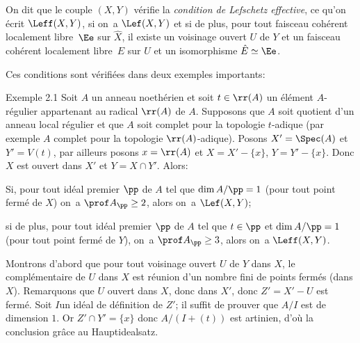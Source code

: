 On dit que le couple $(X, Y)$ v\'erifie la \emph{condition de Lefschetz effective}, ce qu'on \'ecrit $\Leff(X, Y)$, si on~a $\Lef(X, Y)$ et si de plus, pour tout faisceau coh\'erent localement libre~$\Ee$ sur $\hat{X}$, il existe un voisinage ouvert $U$ de $Y$ et un faisceau coh\'erent localement libre~$E$ sur $U$ et un isomorphisme $\hat{E}\simeq\Ee$.

Ces conditions sont v\'erifi\'ees dans deux exemples importants:

\label{X.2.1}
\begin{enonce*}[remark]{Exemple 2.1\ndemark}
 Soit $A$ un anneau noeth\'erien et soit $t\in \rr(A)$ un \'el\'ement $A$-r\'egulier appartenant au radical $\rr(A)$ de $A$. Supposons que $A$ soit quotient d'un anneau local r\'egulier et que $A$ soit complet pour la topologie $t$-adique (par exemple $A$ complet pour la topologie $\rr(A)$-adique). Posons $X'=\Spec(A)$ et $Y'=V(t)$, par ailleurs posons $x=\rr(A)$ et $X=X'-\{x\}$, $Y=Y'-\{x\}$. Donc $X$ est ouvert dans $X'$ et $Y=X\cap Y'$. Alors:
\begin{enumeratei}
\item
Si, pour tout id\'eal premier $\pp$ de $A$ tel que $\dim A/\pp=1$ (\ie pour tout point ferm\'e de $X$) on~a $\prof A_{\pp}\geq 2$, alors on~a $\Lef(X, Y)$;

\item
si de plus, pour tout id\'eal premier $\pp$ de $A$ tel que $t\in\pp$ et $\dim A/\pp=1$ (\ie pour tout point ferm\'e de $Y$), on~a $\prof A_{\pp}\geq 3$, alors on~a $\Leff(X, Y)$.
\end{enumeratei}
\end{enonce*}

Montrons d'abord que pour tout voisinage ouvert $U$ de $Y$ dans $X$, le compl\'ementaire de $U$ dans $X$ est r\'eunion d'un nombre fini de points ferm\'es (dans $X$). Remarquons que $U$ ouvert dans $X$, donc dans $X'$, donc $Z'=X'-U$ est ferm\'e. Soit $I$\pageoriginale un id\'eal de d\'efinition de $Z'$; il suffit de prouver que $A/I$ est de dimension $1$. Or $Z'\cap Y'=\{x\}$ donc $A/(I+(t))$ est artinien, d'o\`u la conclusion gr\^ace au \og Hauptidealsatz\fg.

